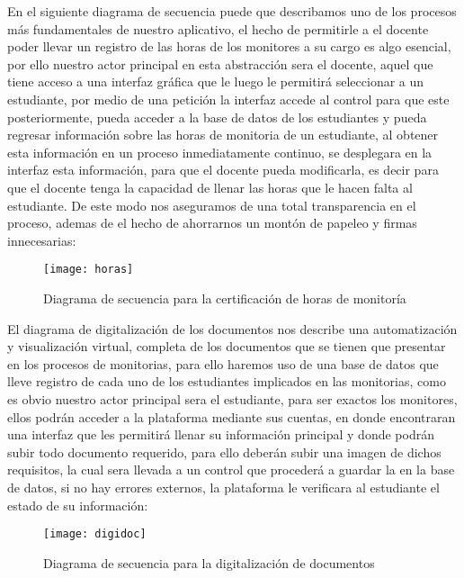En el siguiente diagrama de secuencia puede que describamos uno de los procesos más fundamentales de nuestro aplicativo, el hecho de permitirle a el docente poder llevar un registro de las horas de los monitores a su cargo es algo esencial, por ello nuestro actor principal en esta abstracción sera el docente, aquel que tiene acceso a una interfaz gráfica que le luego le permitirá seleccionar a un estudiante, por medio de una petición la interfaz accede  al control para que este posteriormente, pueda acceder a la base de datos de los estudiantes y pueda regresar información sobre las horas de monitoria de un estudiante, al obtener esta información en un proceso inmediatamente continuo, se desplegara en la interfaz esta información, para que el docente pueda modificarla, es decir para que el docente tenga la capacidad de llenar las horas que le hacen falta al estudiante. De este modo nos aseguramos de una total transparencia en el proceso, ademas de el hecho de ahorrarnos un montón de papeleo y firmas innecesarias:
\begin{figure}[H]
	\centering
	\texttt{[image: horas]}
    \centering
    \caption{Diagrama de secuencia para la certificación de horas de monitoría}
	\label{fig:dsehoras}
\end{figure}

El diagrama de digitalización de los documentos nos describe una automatización y visualización virtual, completa de los documentos que se tienen que presentar en los procesos de monitorias, para ello haremos uso de una base de datos que lleve registro de cada uno de los estudiantes implicados en las monitorias, como es obvio nuestro actor principal sera el estudiante, para ser exactos los monitores, ellos podrán acceder a la plataforma mediante sus cuentas, en donde encontraran una interfaz que les permitirá llenar su información principal y donde podrán subir todo documento requerido, para ello deberán subir una imagen de dichos requisitos, la cual sera llevada a un control que procederá a guardar la en la base de datos, si no hay errores externos, la plataforma le verificara al estudiante el estado de su  información:
\begin{figure}[H]
	\centering
	\texttt{[image: digidoc]}
    \centering
    \caption{Diagrama de secuencia para la digitalización de documentos}
	\label{fig:dsedigidoc}
\end{figure}


\newpage

